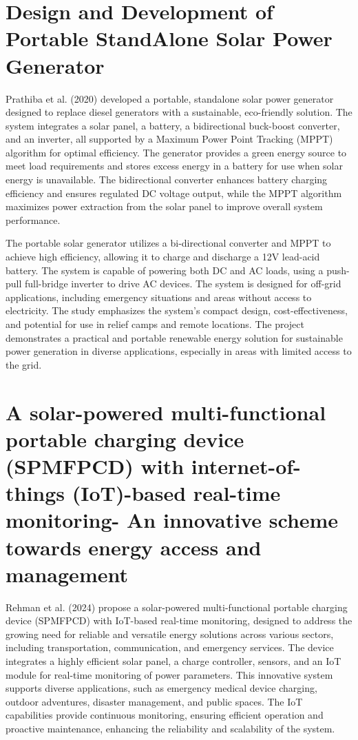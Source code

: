 {\section{Design and Development of Portable StandAlone Solar Power Generator }

Prathiba et al. (2020) developed a portable, standalone solar power generator designed to replace diesel generators with a sustainable, eco-friendly solution. The system integrates a solar panel, a battery, a bidirectional buck-boost converter, and an inverter, all supported by a Maximum Power Point Tracking (MPPT) algorithm for optimal efficiency. The generator provides a green energy source to meet load requirements and stores excess energy in a battery for use when solar energy is unavailable. The bidirectional converter enhances battery charging efficiency and ensures regulated DC voltage output, while the MPPT algorithm maximizes power extraction from the solar panel to improve overall system performance.

The portable solar generator utilizes a bi-directional converter and MPPT to achieve high efficiency, allowing it to charge and discharge a 12V lead-acid battery. The system is capable of powering both DC and AC loads, using a push-pull full-bridge inverter to drive AC devices. The system is designed for off-grid applications, including emergency situations and areas without access to electricity. The study emphasizes the system's compact design, cost-effectiveness, and potential for use in relief camps and remote locations. The project demonstrates a practical and portable renewable energy solution for sustainable power generation in diverse applications, especially in areas with limited access to the grid.

\section{A solar-powered multi-functional portable charging device (SPMFPCD) with internet-of-things (IoT)-based real-time monitoring- An innovative scheme towards energy access and management}

Rehman et al. (2024) propose a solar-powered multi-functional portable charging device (SPMFPCD) with IoT-based real-time monitoring, designed to address the growing need for reliable and versatile energy solutions across various sectors, including transportation, communication, and emergency services. The device integrates a highly efficient solar panel, a charge controller, sensors, and an IoT module for real-time monitoring of power parameters. This innovative system supports diverse applications, such as emergency medical device charging, outdoor adventures, disaster management, and public spaces. The IoT capabilities provide continuous monitoring, ensuring efficient operation and proactive maintenance, enhancing the reliability and scalability of the system.

}
